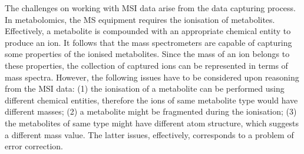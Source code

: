 \documentclass{mprop}
\begin{document}
\par The challenges on working with MSI data arise from the data capturing process. In metabolomics, the MS equipment requires the ionisation of metabolites. Effectively, a metabolite is compounded with an appropriate chemical entity to produce an ion. It follows that the mass spectrometers are capable of capturing some properties of the ionised metabolites. Since the mass of an ion belongs to these properties, the collection of captured ions can be represented in terms of mass spectra. However, the following issues have to be considered upon reasoning from the MSI data: (1) the ionisation of a metabolite can be performed using different chemical entities, therefore the ions of same metabolite type would have different masses; (2) a metabolite might be fragmented during the ionisation; (3) the metabolites of same type might have different atom structure, which suggests a different mass value. The latter issues, effectively, corresponds to a problem of error correction.
 

\end{document}
